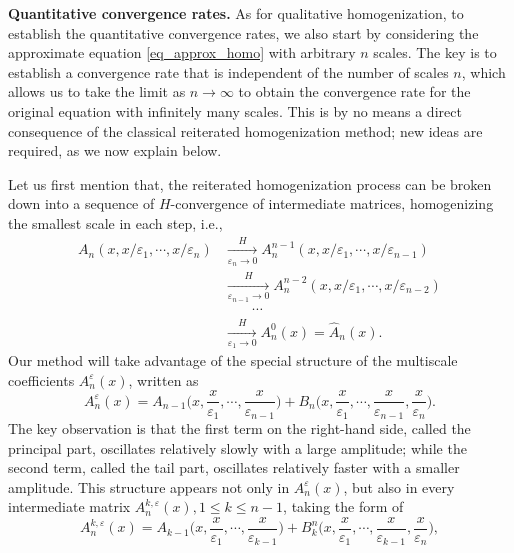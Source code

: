 \documentclass[reqno,12pt]{amsart} %
\theoremstyle{definition}
\theoremstyle{remark}
\numberwithin{equation}{section}
\newcommand{\e}{\varepsilon}
\begin{document}
\noindent\textbf{Quantitative convergence rates.}
As for qualitative homogenization, to establish the quantitative convergence rates, we also start by considering the approximate equation \eqref{eq_approx_homo} with arbitrary $n$ scales. The key is to establish a convergence rate that is independent of the number of scales $n$, which allows us to take the limit as $n\to \infty$ to obtain the convergence rate for the original equation with infinitely many scales.
This is by no means a direct consequence of the classical reiterated homogenization method; new ideas are required, as we now explain below.

Let us first mention that, the reiterated homogenization process can be broken down into a sequence of $H$-convergence of intermediate matrices, homogenizing the smallest scale in each step, i.e.,
\begin{equation}\label{ReteratedHomo-H-conv}
\begin{aligned}
    A_n(x,x/\e_1,\cdots, x/\e_n) & \xrightarrow[\e_n\to 0]{H} A_n^{n-1}(x,x/\e_1,\cdots, x/\e_{n-1}) \\
    & \xrightarrow[\e_{n-1}\to 0]{H} A_n^{n-2}(x,x/\e_1,\cdots, x/\e_{n-2}) \\
    & \qquad \cdots \\
    & \xrightarrow[\e_1\to 0]{H} A^0_n(x) = \widehat{A}_n(x).
\end{aligned}
\end{equation}
Our method will take advantage of the special structure of the multiscale coefficients $A_n^\e(x)$, written as
\begin{equation*}
    A_n^\e(x) = A_{n-1}\Big(x,\frac{x}{\e_1},\cdots, \frac{x}{\e_{n-1}}\Big) + B_n\Big(x, \frac{x}{\e_1}, \cdots, \frac{x}{\e_{n-1}}, \frac{x}{\e_n} \Big).
\end{equation*}
The key observation is that the first term on the right-hand side, called the principal part, oscillates relatively slowly with a large amplitude; while the second term, called the tail part, oscillates relatively faster with a smaller amplitude. This structure appears not only in $A_n^\e(x)$, but also in every intermediate matrix $A_n^{k,\e}(x), 1\le k\le n-1$, taking the form of
\begin{equation*}
    A_n^{k,\e}(x) = A_{k-1}\Big(x,\frac{x}{\e_1},\cdots, \frac{x}{\e_{k-1}}\Big) + B^n_k\Big(x, \frac{x}{\e_1}, \cdots, \frac{x}{\e_{k-1}}, \frac{x}{\e_n} \Big),
\end{equation*}
\end{document}
